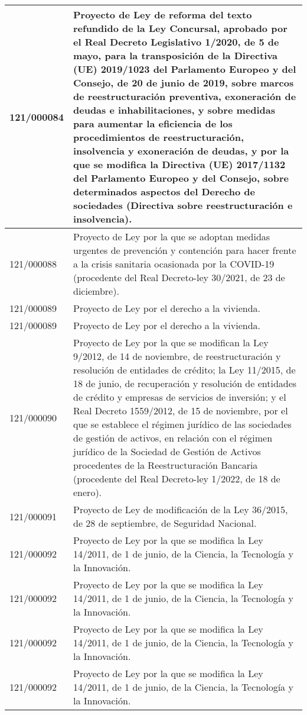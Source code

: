 {\begin{table}[H]
\begin{center}
\begin{tabularx}{\linewidth}{| l | X |}
\hline
121/000084 & Proyecto de Ley de reforma del texto refundido de la Ley Concursal, aprobado por el Real Decreto Legislativo 1/2020, de 5 de mayo, para la transposición de la Directiva (UE) 2019/1023 del Parlamento Europeo y del Consejo, de 20 de junio de 2019, sobre marcos de reestructuración preventiva, exoneración de deudas e inhabilitaciones, y sobre medidas para aumentar la eficiencia de los procedimientos de reestructuración, insolvencia y exoneración de deudas, y por la que se modifica la Directiva (UE) 2017/1132 del Parlamento Europeo y del Consejo, sobre determinados aspectos del Derecho de sociedades (Directiva sobre reestructuración e insolvencia). \\
\hline
121/000088 & Proyecto de Ley por la que se adoptan medidas urgentes de prevención y contención para hacer frente a la crisis sanitaria ocasionada por la COVID-19 (procedente del Real Decreto-ley 30/2021, de 23 de diciembre). \\
\hline
121/000089 & Proyecto de Ley por el derecho a la vivienda. \\
\hline
121/000089 & Proyecto de Ley por el derecho a la vivienda. \\
\hline
121/000090 & Proyecto de Ley por la que se modifican la Ley 9/2012, de 14 de noviembre, de reestructuración y resolución de entidades de crédito; la Ley 11/2015, de 18 de junio, de recuperación y resolución de entidades de crédito y empresas de servicios de inversión; y el Real Decreto 1559/2012, de 15 de noviembre, por el que se establece el régimen jurídico de las sociedades de gestión de activos, en relación con el régimen jurídico de la Sociedad de Gestión de Activos procedentes de la Reestructuración Bancaria (procedente del Real Decreto-ley 1/2022, de 18 de enero). \\
\hline
121/000091 & Proyecto de Ley de modificación de la Ley 36/2015, de 28 de septiembre, de Seguridad Nacional. \\
\hline
121/000092 & Proyecto de Ley por la que se modifica la Ley 14/2011, de 1 de junio, de la Ciencia, la Tecnología y la Innovación. \\
\hline
121/000092 & Proyecto de Ley por la que se modifica la Ley 14/2011, de 1 de junio, de la Ciencia, la Tecnología y la Innovación. \\
\hline
121/000092 & Proyecto de Ley por la que se modifica la Ley 14/2011, de 1 de junio, de la Ciencia, la Tecnología y la Innovación. \\
\hline
121/000092 & Proyecto de Ley por la que se modifica la Ley 14/2011, de 1 de junio, de la Ciencia, la Tecnología y la Innovación. \\

\end{tabularx}
\end{center}
\end{table}}
